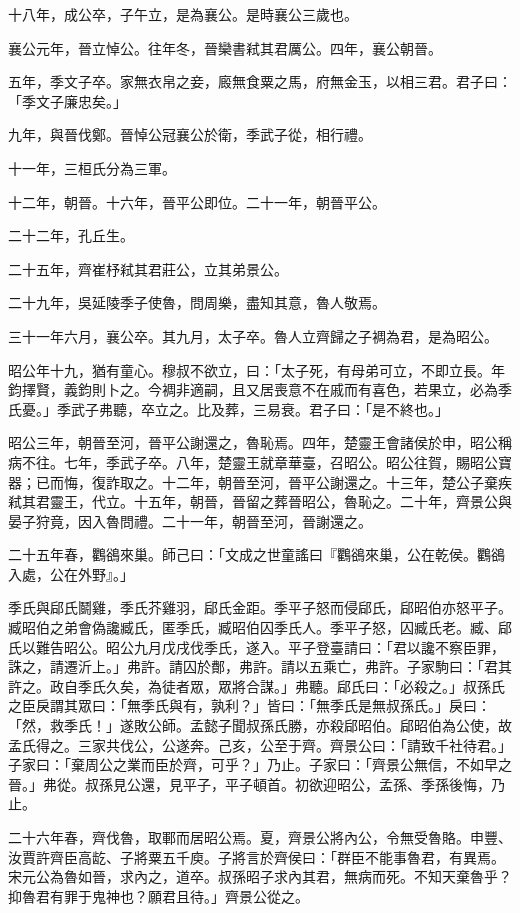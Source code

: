 \begin{pinyinscope}
十八年，成公卒，子午立，是為襄公。是時襄公三歲也。

襄公元年，晉立悼公。往年冬，晉欒書弒其君厲公。四年，襄公朝晉。

五年，季文子卒。家無衣帛之妾，廄無食粟之馬，府無金玉，以相三君。君子曰：「季文子廉忠矣。」

九年，與晉伐鄭。晉悼公冠襄公於衛，季武子從，相行禮。

十一年，三桓氏分為三軍。

十二年，朝晉。十六年，晉平公即位。二十一年，朝晉平公。

二十二年，孔丘生。

二十五年，齊崔杼弒其君莊公，立其弟景公。

二十九年，吳延陵季子使魯，問周樂，盡知其意，魯人敬焉。

三十一年六月，襄公卒。其九月，太子卒。魯人立齊歸之子裯為君，是為昭公。

昭公年十九，猶有童心。穆叔不欲立，曰：「太子死，有母弟可立，不即立長。年鈞擇賢，義鈞則卜之。今裯非適嗣，且又居喪意不在戚而有喜色，若果立，必為季氏憂。」季武子弗聽，卒立之。比及葬，三易衰。君子曰：「是不終也。」

昭公三年，朝晉至河，晉平公謝還之，魯恥焉。四年，楚靈王會諸侯於申，昭公稱病不往。七年，季武子卒。八年，楚靈王就章華臺，召昭公。昭公往賀，賜昭公寶器；已而悔，復詐取之。十二年，朝晉至河，晉平公謝還之。十三年，楚公子棄疾弒其君靈王，代立。十五年，朝晉，晉留之葬晉昭公，魯恥之。二十年，齊景公與晏子狩竟，因入魯問禮。二十一年，朝晉至河，晉謝還之。

二十五年春，鸜鵒來巢。師己曰：「文成之世童謠曰『鸜鵒來巢，公在乾侯。鸜鵒入處，公在外野』。」

季氏與郈氏鬬雞，季氏芥雞羽，郈氏金距。季平子怒而侵郈氏，郈昭伯亦怒平子。臧昭伯之弟會偽讒臧氏，匿季氏，臧昭伯囚季氏人。季平子怒，囚臧氏老。臧、郈氏以難告昭公。昭公九月戊戌伐季氏，遂入。平子登臺請曰：「君以讒不察臣罪，誅之，請遷沂上。」弗許。請囚於鄪，弗許。請以五乘亡，弗許。子家駒曰：「君其許之。政自季氏久矣，為徒者眾，眾將合謀。」弗聽。郈氏曰：「必殺之。」叔孫氏之臣戾謂其眾曰：「無季氏與有，孰利？」皆曰：「無季氏是無叔孫氏。」戾曰：「然，救季氏！」遂敗公師。孟懿子聞叔孫氏勝，亦殺郈昭伯。郈昭伯為公使，故孟氏得之。三家共伐公，公遂奔。己亥，公至于齊。齊景公曰：「請致千社待君。」子家曰：「棄周公之業而臣於齊，可乎？」乃止。子家曰：「齊景公無信，不如早之晉。」弗從。叔孫見公還，見平子，平子頓首。初欲迎昭公，孟孫、季孫後悔，乃止。

二十六年春，齊伐魯，取鄆而居昭公焉。夏，齊景公將內公，令無受魯賂。申豐、汝賈許齊臣高龁、子將粟五千庾。子將言於齊侯曰：「群臣不能事魯君，有異焉。宋元公為魯如晉，求內之，道卒。叔孫昭子求內其君，無病而死。不知天棄魯乎？抑魯君有罪于鬼神也？願君且待。」齊景公從之。


\end{pinyinscope}
